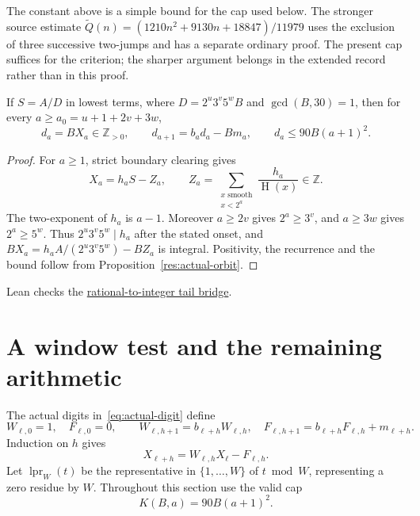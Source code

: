 \documentclass[11pt]{article}
\newcommand{\hgt}{\operatorname{H}}
\begin{document}
The constant above is a simple bound for the cap used below.  The stronger
source estimate
$\widetilde Q(n)=(1210n^2+9130n+18847)/11979$ uses the exclusion of three
successive two-jumps and has a separate ordinary proof.  The present cap
suffices for the criterion; the sharper argument belongs in the extended
record rather than in this proof.

\begin{theorem}
\label{res:denominator-reduction}
If $S=A/D$ in lowest terms, where
$D=2^u3^v5^wB$ and $\gcd(B,30)=1$, then for every
$a\ge a_0=u+1+2v+3w$,
\[
 d_a=BX_a\in\mathbb Z_{>0},\qquad
 d_{a+1}=b_ad_a-Bm_a,\qquad d_a\le90B(a+1)^2.
\]
\end{theorem}
\begin{proof}
For $a\ge1$, strict boundary clearing gives
\begin{equation}\label{eq:prefix-lattice}
 X_a=h_aS-Z_a,\qquad
 Z_a=\sum_{\substack{x\text{ smooth}\\x<2^a}}\frac{h_a}{\hgt(x)}\in\mathbb Z.
\end{equation}
The two-exponent of $h_a$ is $a-1$.  Moreover $a\ge2v$ gives
$2^a\ge3^v$, and $a\ge3w$ gives $2^a\ge5^w$.
Thus $2^u3^v5^w\mid h_a$ after the stated onset, and
$BX_a=h_aA/(2^u3^v5^w)-BZ_a$ is integral.  Positivity, the recurrence
and the bound follow from Proposition~\ref{res:actual-orbit}.
\end{proof}

\noindent Lean checks the \href{https://github.com/wcook04/plectis-erdos/blob/f36a98bf3d3e6f65f1074e3b800e3293d5b8a51a/ErdosProblems/Erdos269/PaperR7RationalBridge.lean#L80}{rational-to-integer tail bridge}.

\section{A window test and the remaining arithmetic}
\label{sec:escape}\label{sec:open}
The actual digits in~\eqref{eq:actual-digit} define
\[
 W_{\ell,0}=1,\quad F_{\ell,0}=0,\qquad
 W_{\ell,h+1}=b_{\ell+h}W_{\ell,h},\quad
 F_{\ell,h+1}=b_{\ell+h}F_{\ell,h}+m_{\ell+h}.
\]
Induction on $h$ gives
\begin{equation}\label{eq:actual-tail}
 X_{\ell+h}=W_{\ell,h}X_\ell-F_{\ell,h}.
\end{equation}
Let $\operatorname{lpr}_W(t)$ be the representative in $\{1,\ldots,W\}$
of $t\bmod W$, representing a zero residue by $W$.
Throughout this section use the valid cap
\begin{equation}\label{eq:actual-bound}
 K(B,a)=90B(a+1)^2.
\end{equation}
\end{document}
